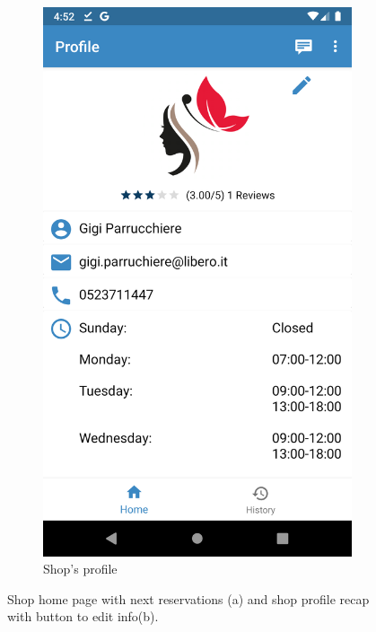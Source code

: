 \begin{figure}[h]
\begin{subfigure}{.5\textwidth}
  \includegraphics[height=.4\textheight, keepaspectratio=true]{Img/Screens/Shop_Profile1}
  \caption{Shop's profile}
\end{subfigure}
\caption{Shop home page with next reservations (a) and shop profile recap with button to edit info(b).}
\end{figure}

